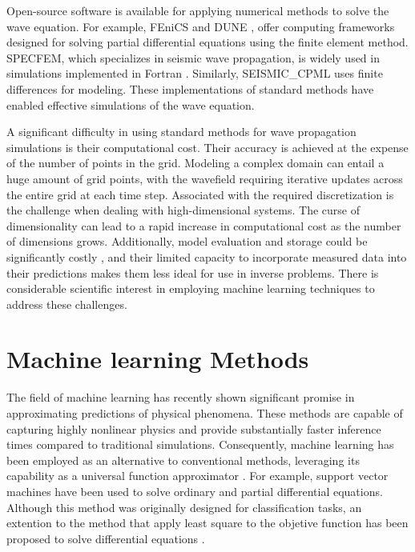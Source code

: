 \documentclass[11pt,twoside]{article}
\begin{document}
Open-source software is available for applying numerical methods to solve the wave equation. For example, FEniCS 
and DUNE \citep{FEniCS,sander_dune_2020}, offer computing frameworks designed for solving partial differential 
equations using the finite element method. SPECFEM, which specializes in seismic wave propagation, is widely used 
in simulations implemented in Fortran \citep{dimitri_komatitsch_2023_10415228,komatitsch_2024_10823181}. Similarly, 
SEISMIC\_CPML \citep{komatitsch_unsplit_2007} uses finite differences for modeling. These implementations of 
standard methods have enabled effective simulations of the wave equation.

A significant difficulty in using standard methods for wave propagation simulations is their computational cost. Their 
accuracy is achieved at the expense of the number of points in the grid. Modeling a complex domain can entail a huge 
amount of grid points, with the wavefield requiring iterative updates across the entire grid at each time step. 
Associated with the required discretization is the challenge when dealing with high-dimensional systems. The curse 
of dimensionality can lead to a rapid increase in computational cost as the number of dimensions grows. Additionally, 
model evaluation and storage could be significantly costly \citep{saloma_computational_1993}, and their 
limited capacity to incorporate measured data into their predictions makes them less ideal for use in inverse problems. 
There is considerable scientific interest in employing machine learning techniques to address these challenges.

\section{Machine learning Methods}\label{sec:machine_learning_methods}

The field of machine learning has recently shown significant promise in approximating predictions of physical 
phenomena. These methods are capable of capturing highly nonlinear physics and provide substantially faster inference 
times compared to traditional simulations. Consequently, machine learning has been employed as an alternative to 
conventional methods, leveraging its capability as a universal function approximator \citep{hornik_approximation_1991}.
For example, support vector machines have been used to solve ordinary and partial differential equations. Although 
this method was originally designed for classification tasks, an extention to the method that apply least square to 
the objetive function has been proposed to solve differential equations \citep{mehrkanoon_approximate_2012,
mehrkanoon_learning_2015}.
\end{document}
